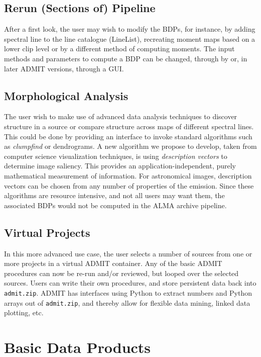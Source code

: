 \documentclass{article}
\begin{document}
\subsection{Rerun (Sections of) Pipeline}

After a first look, the user may wish to modify the BDPs, for instance,
by adding spectral line to the line catalogue (LineList), recreating
moment maps based on a lower clip level or by a different method of
computing moments.  The input methods and parameters to compute a BDP
can be changed, through by or, in later ADMIT versions, through a GUI.

\subsection{Morphological Analysis} 

The user wish to make use of advanced data analysis techniques to discover
structure in a source or compare structure across maps of different
spectral lines.  This could be done by providing an interface to invoke
standard algorithms such as {\it clumpfind} or dendrograms.
A new algorithm we propose to develop, taken from computer science
visualization techniques, is using {\it description vectors} to
determine image saliency.  This provides an application-independent,
purely mathematical measurement of information.  For astronomical images,
description vectors can be chosen from any number of properties of the
emission.  Since these algorithms are resource intensive, and not all
users may want them, the associated BDPs would not be computed in the
ALMA archive pipeline.


\subsection{Virtual Projects}

In this more advanced use case, the user selects a number of sources from
one or more projects in a virtual ADMIT container. Any of the basic ADMIT
procedures can now be re-run and/or reviewed, but looped over the selected
sources.  Users can write their own procedures, and store persistent data
back into {\tt admit.zip}. ADMIT has interfaces using Python to extract
numbers and Python arrays out of {\tt admit.zip}, and thereby allow for
flexible data mining, linked data plotting, etc.

\section{Basic Data Products}
\end{document}
